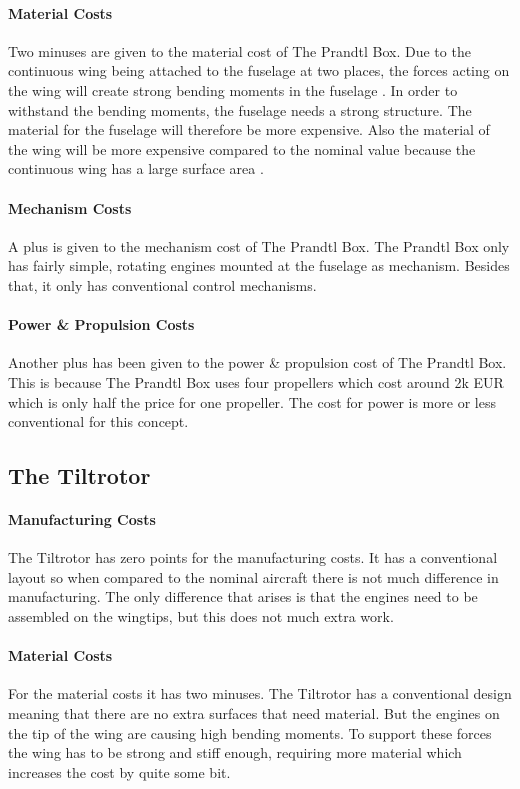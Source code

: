 \paragraph{Material Costs}
Two minuses are given to the material cost of The Prandtl Box. Due to the continuous wing being attached to the fuselage at two places, the forces acting on the wing will create strong bending moments in the fuselage \cite{pranbox}. In order to withstand the bending moments, the fuselage needs a strong structure. The material for the fuselage will therefore be more expensive. Also the material of the wing will be more expensive compared to the nominal value because the continuous wing has a large surface area . 

\paragraph{Mechanism Costs}
A plus is given to the mechanism cost of The Prandtl Box. The Prandtl Box only has fairly simple, rotating engines mounted at the fuselage as mechanism. Besides that, it only has conventional control mechanisms.

\paragraph{Power \& Propulsion Costs}
Another plus has been given to the power \& propulsion cost of The Prandtl Box. This is because The Prandtl Box uses four propellers which cost around 2k EUR which is only half the price for one propeller. The cost for power is more or less conventional for this concept.


\subsection{The Tiltrotor}

\paragraph{Manufacturing Costs} 
The Tiltrotor has zero points for the manufacturing costs. It has a conventional layout so when compared to the nominal aircraft there is not much difference in manufacturing. The only difference that arises is that the engines need to be assembled on the wingtips, but this does not much extra work.

\paragraph{Material Costs}
For the material costs it has two minuses. The Tiltrotor has a conventional design meaning that there are no extra surfaces that need material. But the engines on the tip of the wing are causing high bending moments. To support these forces the wing has to be strong and stiff enough, requiring more material which increases the cost by quite some bit.


